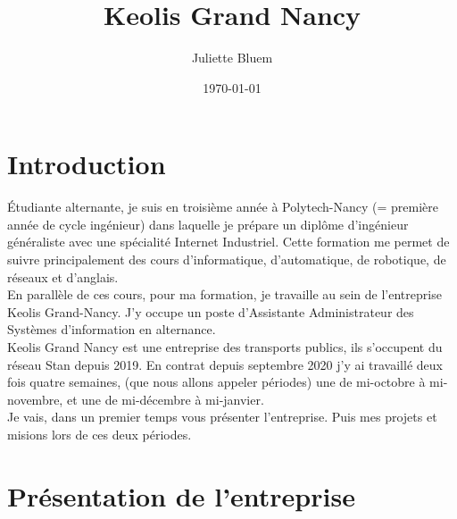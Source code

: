 \documentclass{article}
\author{Juliette Bluem}
\title{Keolis Grand Nancy}
\date{\today}
\begin{document}

\maketitlepage
\notitlepage

\tableofcontents

\pagebreak
\section{Introduction}
Étudiante alternante, je suis en troisième année à Polytech-Nancy (= 
première année de cycle ingénieur) dans laquelle je prépare un diplôme 
d’ingénieur généraliste avec une spécialité Internet Industriel. Cette 
formation me permet de suivre principalement des cours d'informatique, 
d'automatique, de robotique, de réseaux et d'anglais. \\
En parallèle de ces cours, pour ma formation, je travaille au sein de 
l'entreprise Keolis Grand-Nancy. J'y occupe un poste d'Assistante 
Administrateur des Systèmes d'information en alternance.\\
Keolis Grand Nancy est une entreprise des transports publics, ils 
s'occupent du réseau Stan depuis 2019. En contrat depuis septembre 2020 
j'y ai travaillé deux fois quatre semaines, (que nous allons appeler périodes) 
une de mi-octobre à mi-novembre, et une de mi-décembre à mi-janvier.\\
Je vais, dans un premier temps vous présenter l'entreprise. Puis mes 
projets et misions lors de ces deux périodes.

\pagebreak
\section{Présentation de l'entreprise}
\end{document}
